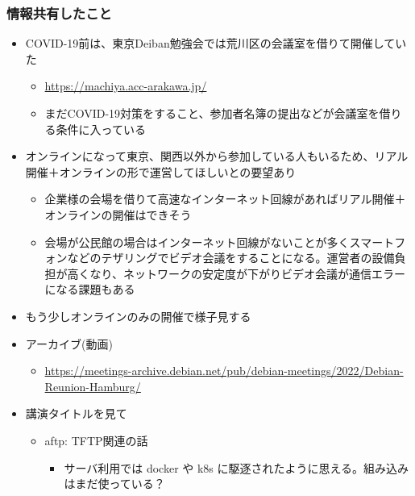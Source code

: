 \documentclass[mingoth,a4paper]{jsarticle}
\begin{document}
\subsubsection{情報共有したこと}


\begin{itemize}
  \item COVID-19前は、東京Deiban勉強会では荒川区の会議室を借りて開催していた
    \begin{itemize}
    \item \url{https://machiya.acc-arakawa.jp/}
    \item まだCOVID-19対策をすること、参加者名簿の提出などが会議室を借りる条件に入っている
    \end{itemize}
  \item オンラインになって東京、関西以外から参加している人もいるため、リアル開催＋オンラインの形で運営してほしいとの要望あり
    \begin{itemize}
    \item 企業様の会場を借りて高速なインターネット回線があればリアル開催＋オンラインの開催はできそう
    \item 会場が公民館の場合はインターネット回線がないことが多くスマートフォンなどのテザリングでビデオ会議をすることになる。運営者の設備負担が高くなり、ネットワークの安定度が下がりビデオ会議が通信エラーになる課題もある
    \end{itemize}
  \item もう少しオンラインのみの開催で様子見する
\end{itemize}



\begin{itemize}
\item アーカイブ(動画)
  \begin{itemize}
  \item \url{https://meetings-archive.debian.net/pub/debian-meetings/2022/Debian-Reunion-Hamburg/}
  \end{itemize}
\item 講演タイトルを見て
  \begin{itemize}
  \item aftp: TFTP関連の話
    \begin{itemize}
    \item サーバ利用では docker や k8s に駆逐されたように思える。組み込みはまだ使っている？
    \end{itemize}
  \end{itemize}
\end{itemize}
\end{document}
